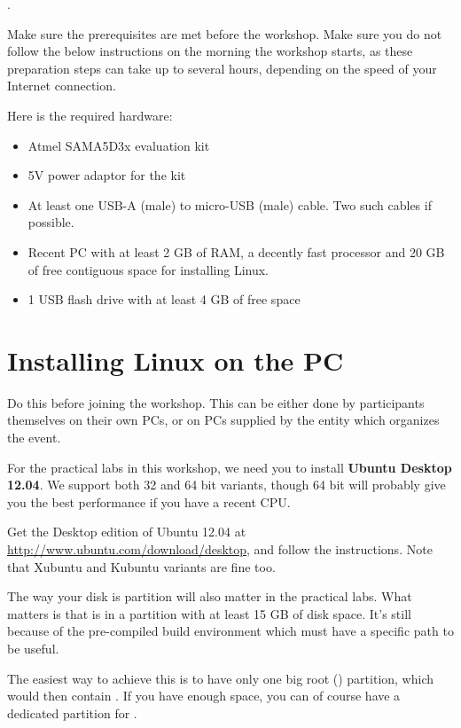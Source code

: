 .

Make sure the prerequisites are met before the workshop. Make sure you
do not follow the below instructions on the morning the workshop starts,
as these preparation steps can take up to several hours, depending
on the speed of your Internet connection.

Here is the required hardware:
\begin{itemize}
\item Atmel SAMA5D3x evaluation kit
\item 5V power adaptor for the kit
\item At least one USB-A (male) to micro-USB (male) cable. Two such
      cables if possible.
\item Recent PC with at least 2 GB of RAM, a decently fast processor
      and 20 GB of free contiguous space for installing Linux.
\item 1 USB flash drive with at least 4 GB of free space
\end{itemize}

\section{Installing Linux on the PC}

Do this before joining the workshop. This can be either done by
participants themselves on their own PCs, or on PCs supplied by the
entity which organizes the event.

For the practical labs in this workshop, we need you to install
{\bf Ubuntu Desktop 12.04}. We support both 32 and 64 bit variants,
though 64 bit will probably give you the best performance
if you have a recent CPU.

Get the Desktop edition of Ubuntu 12.04 at
\url{http://www.ubuntu.com/download/desktop}, and follow the
instructions. Note that Xubuntu and Kubuntu variants are fine too.

The way your disk is partition will also matter in the practical labs.
What matters is that  is in a partition with at least 15 GB
of disk space. It's still because of the pre-compiled build environment
which must have a specific path to be useful.

The easiest way to achieve this is to have only one big root (\code{/})
partition, which would then contain . If you have enough
space, you can of course have a dedicated partition for .

